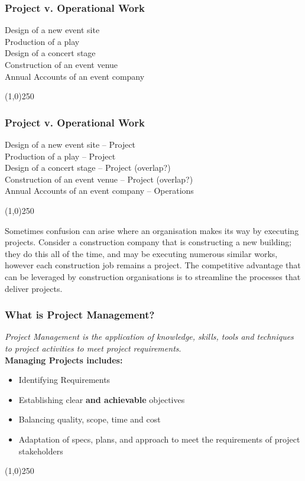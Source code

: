 \begin{frame}
\frametitle{Project v. Operational Work}
Design of a new event site\\
Production of a play\\
Design of a concert stage\\
Construction of an event venue\\
Annual Accounts of an event company\\
\end{frame}
\begin{center}\line(1,0){250}\end{center}



\begin{frame}
\frametitle{Project v. Operational Work}
Design of a new event site -- Project\\
Production of a play -- Project \\
Design of a concert stage -- Project (overlap?)\\
Construction of an event venue -- Project (overlap?)\\
Annual Accounts of an event company -- Operations\\
\end{frame}
\begin{center}\line(1,0){250}\end{center}
Sometimes confusion can arise where an organisation makes its way by executing projects.  Consider a construction company that is constructing a new building; they do this all of the time, and may be executing numerous similar works, however each construction job remains a project.  The competitive advantage that can be leveraged by construction organisations is to streamline the processes that deliver projects.  




\begin{frame}
\frametitle{What is Project Management?}
\textit{Project Management is the application of knowledge, skills, tools and techniques to project activities to meet project requirements}.\\
\textbf{Managing Projects includes:}\\
\begin{itemize}
	\item Identifying Requirements
	\item Establishing clear \textbf{and achievable} objectives
	\item Balancing quality, scope, time and cost
	\item Adaptation of specs, plans, and approach to meet the requirements of project stakeholders
\end{itemize}
\end{frame}
\begin{center}\line(1,0){250}\end{center}




